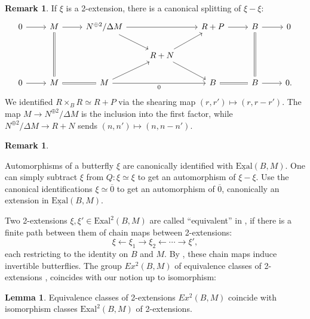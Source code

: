 \documentclass[11pt,reqno]{amsart}
\theoremstyle{definition}
\newtheorem{lemma}[theorem]{Lemma}
\newtheorem{remark}[theorem]{Remark}
\newcommand{\EExal}{\underline{\textrm{Exal}}}
\newcommand{\Exal}{\textrm{Exal}}
\renewcommand{\bar}[1]{\overline{#1}}
\begin{document}
\begin{remark}

If $\xi$ is a 2-extension, there is a canonical splitting of $\xi-\xi$:
\[\begin{tikzcd}
0  \ar[r] &M \ar[r] \ar[dd, equals] &N^{\oplus 2}/\Delta M  \ar[rr] \ar[dr] & &R + P \ar[r] &B \ar[r] \ar[dd, equals] &0 \\
 & & &R + N \ar[dr] \ar[ur] \\
0 \ar[r] &M \ar[r, equals] &M \ar[rr, "0", swap] \ar[ur] & &B \ar[r, equals] &B \ar[r] &0.
\end{tikzcd}\]
We identified $R \times_B R \simeq R + P$ via the shearing map $(r, r') \mapsto (r, r-r')$. The map $M \to N^{\oplus 2}/\Delta M$ is the inclusion into the first factor, while $N^{\oplus 2}/\Delta M \to R + N$ sends $(n, n') \mapsto (n, n-n')$. 


\end{remark}






\begin{remark}\label{rmk:buttaut=exal}


Automorphisms of a butterfly $\xi$ are canonically identified with $\EExal(B, M)$. One can simply subtract $\xi$ from $Q : \xi \simeq \xi$ to get an automorphism of $\xi - \xi$. Use the canonical identifications $\xi \simeq \bar 0$ to get an automorphism of $\bar 0$, canonically an extension in $\EExal(B, M)$. 

\end{remark}




Two 2-extensions $\xi, \xi' \in \Exal^2(B, M)$ are called ``equivalent'' in \cite{lichtenbaumschlessinger}, \cite[pg. 4]{gerstenhaber2} if there is a finite path between them of chain maps between 2-extensions:
\[\xi \leftarrow \xi_1 \to \xi_2 \leftarrow \cdots \to \xi',\]
each restricting to the identity on $B$ and $M$. By \cite[Proposition 3]{wisebutterflies}, these chain maps induce invertible butterflies. The group $Ex^2(B, M)$ of equivalence classes of 2-extensions \cite[Definition 4.1.1]{lichtenbaumschlessinger}, \cite[pg. 4]{gerstenhaber2} coincides with our notion up to isomorphism:

\begin{lemma}\label{lem:LSequiv=isom}
Equivalence classes of 2-extensions $Ex^2(B, M)$ coincide with isomorphism classes $\Exal^2(B, M)$ of 2-extensions. 
\end{lemma}
\end{document}
